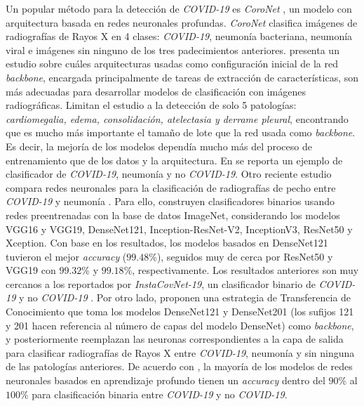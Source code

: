 Un popular método para la detección de \textit{COVID-19} es \textit{CoroNet} \cite{wang2020covid}, un
modelo con arquitectura basada en redes neuronales profundas. \textit{CoroNet} clasifica imágenes de
radiografías de Rayos X en 4 clases: \textit{COVID-19}, neumonía bacteriana, neumonía viral e imágenes
sin ninguno de los tres padecimientos anteriores. \citeauthor{bressem2020comparing} presenta un estudio
sobre cuáles arquitecturas usadas como configuración inicial de la red \textit{backbone}, encargada
principalmente de tareas de extracción de características, son más adecuadas para desarrollar modelos
de clasificación con imágenes radiográficas. Limitan el estudio a la detección de solo 5 patologías:
\textit{cardiomegalia, edema, consolidación, atelectasia y derrame pleural}, encontrando que es mucho más
importante el tamaño de lote que la red usada como \textit{backbone}. Es decir, la mejoría de los
modelos dependía mucho más del proceso de entrenamiento que de los datos y la arquitectura.
En \cite{zhong2021deep} se reporta un ejemplo de clasificador de \textit{COVID-19}, neumonía y
no \textit{COVID-19}. Otro reciente estudio compara redes neuronales para la clasificación de
radiografías de pecho entre \textit{COVID-19} y neumonía \cite{shazia2021comparative}. Para ello,
construyen clasificadores binarios usando redes preentrenadas con la base de datos ImageNet,
considerando los modelos VGG16 y VGG19, DenseNet121, Inception-ResNet-V2, InceptionV3, ResNet50 y
Xception. Con base en los resultados, los modelos basados en DenseNet121 tuvieron el mejor
\textit{accuracy} ($99.48\%$), seguidos muy de cerca por ResNet50 y VGG19 con $99.32\%$ y $99.18\%$,
respectivamente. Los resultados anteriores son muy cercanos a los reportados por
\textit{InstaCovNet-19}, un clasificador binario de \textit{COVID-19} y no \textit{COVID-19}
\cite{gupta2021instacovnet}. Por otro lado, \citeauthor{bassi2021deep} proponen una estrategia de
Transferencia de Conocimiento que toma los modelos DenseNet121 y DenseNet201 (los sufijos 121 y 201
hacen referencia al número de capas del modelo DenseNet) como \textit{backbone}, y posteriormente reemplazan
las neuronas correspondientes a la capa de salida para clasificar radiografías de Rayos X entre
\textit{COVID-19}, neumonía y sin ninguna de las patologías anteriores. De acuerdo con
\citeauthor{shoeibi2020automated}, la mayoría de los modelos de redes neuronales basados en aprendizaje
profundo tienen un \textit{accuracy} dentro del $90\%$ al $100\%$ para clasificación binaria entre
\textit{COVID-19} y no \textit{COVID-19}.


